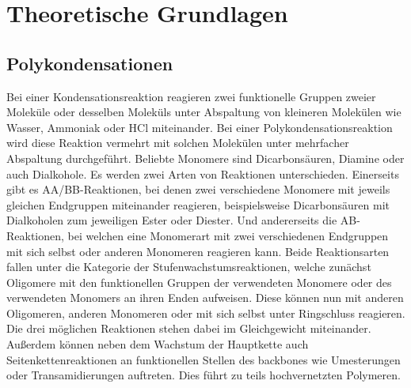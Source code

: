 \documentclass[12pt, bibliography=totocnumbered]{scrartcl}
\begin{document}

\tableofcontents
\thispagestyle{empty}
\newpage
\setcounter{page}{1}
\section{Theoretische Grundlagen}
\subsection{Polykondensationen}
Bei einer Kondensationsreaktion reagieren zwei funktionelle Gruppen zweier Moleküle oder desselben Moleküls unter Abspaltung von kleineren Molekülen wie Wasser, Ammoniak oder HCl miteinander. Bei einer Polykondensationsreaktion wird diese Reaktion vermehrt mit solchen Molekülen unter mehrfacher Abspaltung durchgeführt. Beliebte Monomere sind Dicarbonsäuren, Diamine oder auch Dialkohole. Es werden zwei Arten von Reaktionen unterschieden. Einerseits gibt es AA/BB-Reaktionen, bei denen zwei verschiedene Monomere mit jeweils gleichen Endgruppen miteinander reagieren, beispielsweise Dicarbonsäuren mit Dialkoholen zum jeweiligen Ester oder Diester. Und andererseits die AB-Reaktionen, bei welchen eine Monomerart mit zwei verschiedenen Endgruppen mit sich selbst oder anderen Monomeren reagieren kann. Beide Reaktionsarten fallen unter die Kategorie der Stufenwachstumsreaktionen, welche zunächst Oligomere mit den funktionellen Gruppen der verwendeten Monomere oder des verwendeten Monomers an ihren Enden aufweisen. Diese können nun mit anderen Oligomeren, anderen Monomeren oder mit sich selbst unter Ringschluss reagieren. Die drei möglichen Reaktionen stehen dabei im Gleichgewicht miteinander. Außerdem können neben dem Wachstum der Hauptkette auch Seitenkettenreaktionen an funktionellen Stellen des backbones  wie Umesterungen oder Transamidierungen auftreten. Dies führt zu teils hochvernetzten Polymeren. 
\end{document}
